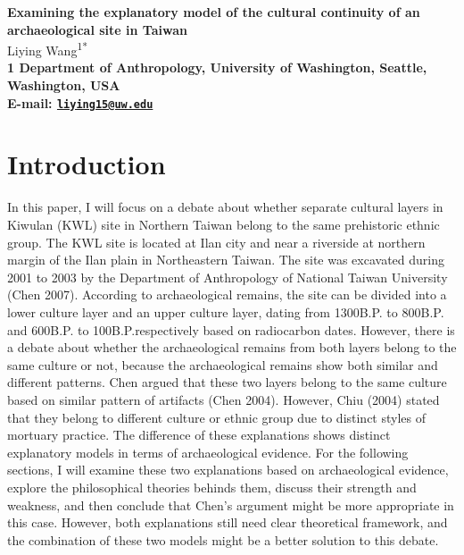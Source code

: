 \documentclass[10pt]{article}
\date{}
\begin{document}
\begin{flushleft}
{\Large
\textbf{Examining the explanatory model of the cultural continuity of an
archaeological site in Taiwan}
}
\\
  Liying Wang\textsuperscript{1*}\\
\bf{1} Department of Anthropology, University of Washington,  Seattle,  Washington,  USA
\\

\textasteriskcentered{} E-mail:   \href{mailto:liying15@uw.edu}{\nolinkurl{liying15@uw.edu}}

\end{flushleft}

\section*{Introduction}\label{introduction}

In this paper, I will focus on a debate about whether separate cultural
layers in Kiwulan (KWL) site in Northern Taiwan belong to the same
prehistoric ethnic group. The KWL site is located at Ilan city and near
a riverside at northern margin of the Ilan plain in Northeastern Taiwan.
The site was excavated during 2001 to 2003 by the Department of
Anthropology of National Taiwan University (Chen 2007). According to
archaeological remains, the site can be divided into a lower culture
layer and an upper culture layer, dating from 1300B.P. to 800B.P. and
600B.P. to 100B.P.respectively based on radiocarbon dates. However,
there is a debate about whether the archaeological remains from both
layers belong to the same culture or not, because the archaeological
remains show both similar and different patterns. Chen argued that these
two layers belong to the same culture based on similar pattern of
artifacts (Chen 2004). However, Chiu (2004) stated that they belong to
different culture or ethnic group due to distinct styles of mortuary
practice. The difference of these explanations shows distinct
explanatory models in terms of archaeological evidence. For the
following sections, I will examine these two explanations based on
archaeological evidence, explore the philosophical theories behinds
them, discuss their strength and weakness, and then conclude that Chen's
argument might be more appropriate in this case. However, both
explanations still need clear theoretical framework, and the combination
of these two models might be a better solution to this debate.
\end{document}

